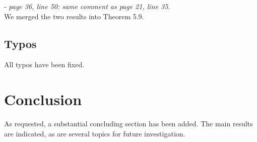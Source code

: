 \documentclass[11pt, oneside]{article}   	%
\begin{document}
- \emph{page 36, line 50: same comment as page 21, line 35.} \\

We merged the two results into Theorem 5.9. 


\subsection{Typos}

All typos have been fixed. 

\section{Conclusion}

As requested, a substantial concluding section has been added. The main results are indicated, as are several topics for future investigation.
\end{document}
